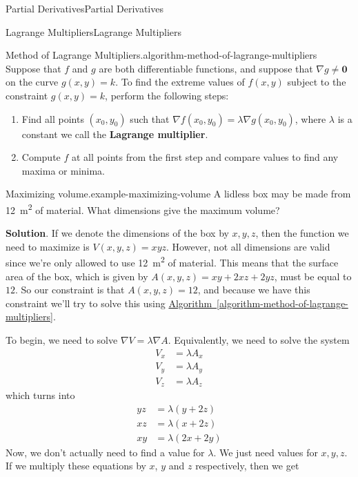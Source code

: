 \documentclass[10pt,]{book}
\newcommand{\terminology}[1]{\textbf{#1}}
\numberwithin{equation}{section}
\newcommand{\vv}[1]{\mathbf{#1}}
\newcommand{\grad}{\nabla}
\begin{document}
\begin{chapterptx}{Partial Derivatives}{}{Partial Derivatives}{}{}
\begin{sectionptx}{Lagrange Multipliers}{}{Lagrange Multipliers}{}{}
\begin{algorithm}{Method of Lagrange Multipliers.}{}{algorithm-method-of-lagrange-multipliers}
\hypertarget{p-1224}{}%
Suppose that \(f\) and \(g\) are both differentiable functions, and suppose that \(\grad g\neq\vv{0}\) on the curve \(g(x,y) = k\). To find the extreme values of \(f(x,y)\) subject to the constraint \(g(x,y) = k\), perform the following steps: \leavevmode%
\begin{enumerate}
\item\hypertarget{li-99}{}Find all points \((x_{0},y_{0})\) such that \(\grad f(x_{0},y_{0}) = \lambda \grad g(x_{0},y_{0})\), where \(\lambda\) is a constant we call the \terminology{Lagrange multiplier}.%
\item\hypertarget{li-100}{}Compute \(f\) at all points from the first step and compare values to find any maxima or minima.%
\end{enumerate}
%
\end{algorithm}
\begin{example}{Maximizing volume.}{example-maximizing-volume}%
\hypertarget{p-1225}{}%
A lidless box may be made from \SI{12}{\meter\tothe{2}} of material. What dimensions give the maximum volume?%
\par\smallskip%
\noindent\textbf{Solution}.\hypertarget{solution-193}{}\quad%
\hypertarget{p-1226}{}%
If we denote the dimensions of the box by \(x,y,z\), then the function we need to maximize is \(V(x,y,z) = xyz\). However, not all dimensions are valid since we're only allowed to use \SI{12}{\meter\tothe{2}} of material. This means that the surface area of the box, which is given by \(A(x,y,z) = xy + 2xz + 2yz\), must be equal to \(12\). So our constraint is that \(A(x,y,z) = 12\), and because we have this constraint we'll try to solve this using \hyperref[algorithm-method-of-lagrange-multipliers]{Algorithm~\ref{algorithm-method-of-lagrange-multipliers}}.%
\par
\hypertarget{p-1227}{}%
To begin, we need to solve \(\grad V = \lambda \grad A\). Equivalently, we need to solve the system%
\begin{align*}
V_{x} & = \lambda A_{x} \\
V_{y} & = \lambda A_{y} \\
V_{z} & = \lambda A_{z} 
\end{align*}
which turns into%
\begin{align*}
yz & = \lambda(y + 2z) \\
xz & = \lambda(x + 2z) \\
xy & = \lambda(2x + 2y) 
\end{align*}
Now, we don't actually need to find a value for \(\lambda\). We just need values for \(x,y,z\). If we multiply these equations by \(x\), \(y\) and \(z\) respectively, then we get%

\end{example}
\end{sectionptx}
\end{chapterptx}
\end{document}
